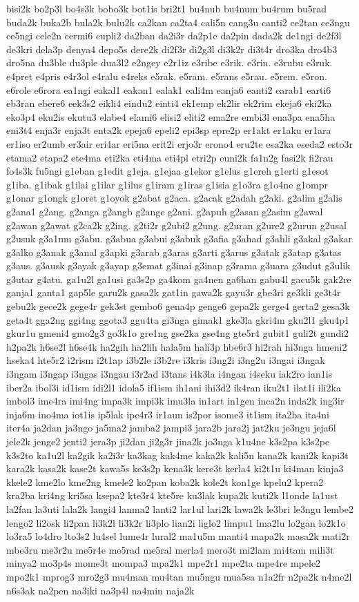 {bisi2k bo2p3l bo4s3k bobo3k bot1is bri2t1 bu4nub bu4num bu4rum bu5rad buda2k buka2b bula2k bulu2k ca2kan ca2ta4 cali5n cang3u canti2 ce2tan ce3ngu ce5ngi cele2n cermi6 cupli2 da2ban da2i3r da2p1e da2pin dada2k de1ngi de2f3l de3kri dela3p denya4 depo5s dere2k di2f3r di2g3l di3k2r di3t4r dro3ka dro4b3 dro5na du3ble du3ple dua3l2 e2ngey e2r1iz e3ribe e3rik. e3rin. e3rubu e3ruk. e4pret e4pris e4r3ol e4ralu e4reks e5rak. e5ram. e5rans e5rau. e5rem. e5ron. e6role e6rora ea1ngi eakal1 eakan1 ealak1 eali4m eanja6 eanti2 earab1 earti6 eb3ran ebere6 eek3s2 eikli4 eindu2 einti4 ek1emp ek2lir ek2rim ekeja6 eki2ka eko3p4 eku2is ekutu3 elabe4 elami6 elisi2 eliti2 ema2re embi3l ena3pa ena5ha eni3t4 enja3r enja3t enta2k epeja6 epeli2 epi3sp epre2p er1akt er1aku er1ara er1iso er2umb er3air eri4ar eri5na erit2i erjo3r erono4 eru2te esa2ka eseda2 esto3r etama2 etapa2 ete4ma eti2ka eti4ma eti4pl etri2p euni2k fa1n2g fasi2k fi2rau fo4s3k fu5ngi g1eban g1edit g1eja. g1ejaa g1ekor g1elus g1ereh g1erti g1esot g1iba. g1ibak g1ilai g1ilar g1ilus g1iram g1iras g1isia g1o3ra g1o4ne g1ompr g1onar g1ongk g1oret g1oyok g2abat g2aca. g2acak g2adah g2aki. g2alim g2alis g2ana1 g2ang. g2anga g2angb g2angc g2ani. g2apuh g2asan g2asim g2awal g2awan g2awat g2ca2k g2ing. g2ti2r g2ubi2 g2ung. g2uran g2ure2 g2urun g2usal g2usuk g3a1um g3abu. g3abua g3abui g3abuk g3afia g3ahad g3ahli g3akal g3akar g3alko g3anak g3anal g3apki g3arab g3aras g3arti g3arus g3atak g3atap g3atas g3aus. g3ausk g3ayak g3ayap g3emat g3inai g3inap g3rama g3uara g3udut g3ulik g3utar g4atu. ga1u2l ga1usi ga3s2p ga4kom ga4nen ga6han gabu4l gacu5k gak2re ganja1 ganta1 gap5le garu2k gasa2k gat1in gawa2k gayu3r gbe3ri ge3kli ge3t4r gebu2k gece2k gege4r gek3st gembo6 gena4p genge6 gepa2k gerge4 gerta2 gesa3k geta4t gga2ng ggi4ng ggota3 ggu4ta gi3nga gimak1 gke3la gkri4m gku2l1 gku4p1 gkur1u gmeni4 gmo2g3 go3k1o gre1ng gse2ka gse4ng gte5r4 gubit1 guli2t gundi2 h2pa2k h6se2l h6se4k ha2gih ha2lih hala5m hali3p hbe6r3 hi2rah hi3nga hmeni2 hseka4 hte5r2 i2rism i2t1ap i3b2le i3b2re i3kris i3ng2i i3ng2u i3ngai i3ngak i3ngam i3ngap i3ngas i3ngau i3r2ad i3tans i4k3la i4ngan i4seku iak2ro ian1is iber2a ibol3i id1ism idi2l1 idola5 if1ism ih1ani ihi3d2 ik4ran iku2t1 ilat1i ili2ka imbol3 ime4ra imi4ng impa3k impi3k imu3la in1art in1gen inca2n inda2k ing3ir inja6m ino4ma iot1is ip5lak ipe4r3 ir1aun is2por isome3 it1ism ita2ba ita4ni iter4a ja2dan ja3ngo ja5ma2 jamba2 jampi3 jara2b jara2j jat2ku je3ngu jeja6l jele2k jenge2 jenti2 jera3p ji2dan ji2g3r jina2k jo3nga k1u4ne k3s2pa k3s2pe k3s2to ka1u2l ka2gik ka2i3r ka3kag kak4me kaka2k kali5n kana2k kani2k kapi3t kara2k kasa2k kase2t kawa5s ke3s2p kena3k kere3t kerla4 ki2t1u ki4man kinja3 kkele2 kme2lo kme2ng kmele2 ko2pan koba2k kole2t kon1ge kpelu2 kpera2 kra2ba kri4ng kri5sa ksepa2 kte3r4 kte5re ku3lak kupa2k kuti2k l1onde la1ust la2fan la3uti lala2k langi4 lanma2 lanti2 lar1ul lari2k lawa2k le3bri le3ngu lembe2 lengo2 li2osk li2pan li3k2l li3k2r li3plo lian2i liglo2 limpu1 lma2lu lo2gan lo2k1o lo3ra5 lo4dro lto3s2 lu4sel lume4r lural2 ma1u5m manti4 mapa2k masa2k mati2r mbe3ru me3r2u me5r4e me5rad me5ral merla4 mero3t mi2lam mi4tam mili3t minya2 mo3p4s mome3t mompa3 mpa2k1 mpe2r1 mpe2ta mpe4re mpele2 mpo2k1 mprog3 mro2g3 mu4man mu4tan mu5ngu mua5sa n1a2fr n2pa2k n4me2l n6s3ak na2pen na3iki na3p4l na4min naja2k }
